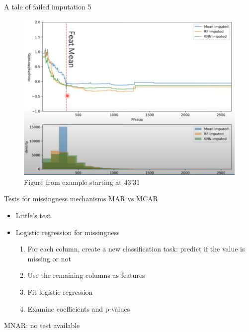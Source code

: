 \documentclass[11pt,compress,t,notes=noshow, xcolor=table]{beamer}
\begin{document}
\begin{frame}{A tale of failed imputation 5}
\vfill
\begin{figure}
    \centering
    \includegraphics[width=0.5\linewidth]{figure_man/Screenshot from 2025-06-03 22-39-01.png}
    \caption{Figure from  example starting at 43'31}
\end{figure}
\vfill
\end{frame}

\begin{frame}{Tests for missingness mechanisms}
\vfill
MAR vs MCAR
\begin{itemize}
    \vfill
    \item Little's test
    \item Logistic regression for missingness
    \begin{enumerate}
        \item For each column, create a new classification task: predict if the value is missing or not
        \item Use the remaining columns as features
        \item Fit logistic regression
        \item Examine coefficients and p-values
    \end{enumerate}
    \vfill
\end{itemize}
MNAR: no test available
\vfill
\end{frame}
\end{document}
